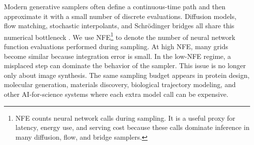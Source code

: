 \documentclass{article}
\theoremstyle{plain}
\theoremstyle{definition}
\theoremstyle{remark}
\begin{document}
Modern generative samplers often define a continuous-time path and then approximate it with a small number of discrete evaluations. Diffusion models, flow matching, stochastic interpolants, and Schr\"odinger bridges all share this numerical bottleneck \citep{ho2020ddpm,kingma2021vdm,karras2022edm,lipman2023flow,albergo2023building,debortoli2021dsb,liu2023i2sb,tong2024simulation}. We use NFE\footnote{NFE counts neural network calls during sampling. It is a useful proxy for latency, energy use, and serving cost because these calls dominate inference in many diffusion, flow, and bridge samplers.} to denote the number of neural network function evaluations performed during sampling. At high NFE, many grids become similar because integration error is small. In the low-NFE regime, a misplaced step can dominate the behavior of the sampler. This issue is no longer only about image synthesis. The same sampling budget appears in protein design, molecular generation, materials discovery, biological trajectory modeling, and other AI-for-science systems where each extra model call can be expensive.

\end{document}
